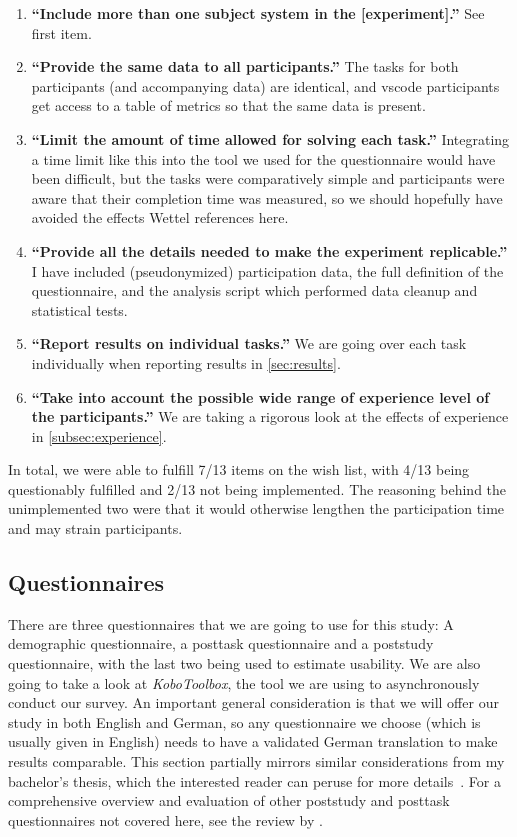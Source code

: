 \documentclass[../thesis]{subfiles}
\begin{document}
\begin{enumerate}
	\item \textbf{\enquote{Include more than one subject system in the [experiment].}}
	      See first item. \cyes
	\item \textbf{\enquote{Provide the same data to all participants.}}
	      The tasks for both participants (and accompanying data) are identical, and \gls{vscode} participants get access to a table of metrics so that the same data is present. \cyes
	\item \textbf{\enquote{Limit the amount of time allowed for solving each task.}}
	      Integrating a time limit like this into the tool we used for the questionnaire would have been difficult, but the tasks were comparatively simple and participants were aware that their completion time was measured, so we should hopefully have avoided the effects Wettel references here. \chmm
	\item \textbf{\enquote{Provide all the details needed to make the experiment replicable.}}
	      I have included (pseudonymized) participation data, the full definition of the questionnaire, and the analysis script which performed data cleanup and statistical tests. \cyes
	\item \textbf{\enquote{Report results on individual tasks.}}
	      We are going over each task individually when reporting results in \cref{sec:results}. \cyes
	\item \textbf{\enquote{Take into account the possible wide range of experience level of the participants.}}
	      We are taking a rigorous look at the effects of experience in \cref{subsec:experience}. \cyes
\end{enumerate}

In total, we were able to fulfill 7/13 items on the wish list, with 4/13 being questionably fulfilled and 2/13 not being implemented.
The reasoning behind the unimplemented two were that it would otherwise lengthen the participation time and may strain participants.

\subsection{Questionnaires}\label{subsec:question}
There are three questionnaires that we are going to use for this study:
A demographic questionnaire, a \gls{posttask} questionnaire and a \gls{poststudy} questionnaire, with the last two being used to estimate usability.
We are also going to take a look at \emph{KoboToolbox}, the tool we are using to asynchronously conduct our survey.
An important general consideration is that we will offer our study in both English and German, so any questionnaire we choose (which is usually given in English) needs to have a validated German translation to make results comparable.
This section partially mirrors similar considerations from my bachelor's thesis, which the interested reader can peruse for more details~\cite[35 \psqq]{galperin2021}.
For a comprehensive overview and evaluation of other \gls{poststudy} and \gls{posttask} questionnaires not covered here, see the review by \textcite{hodrien2021}.
\end{document}
